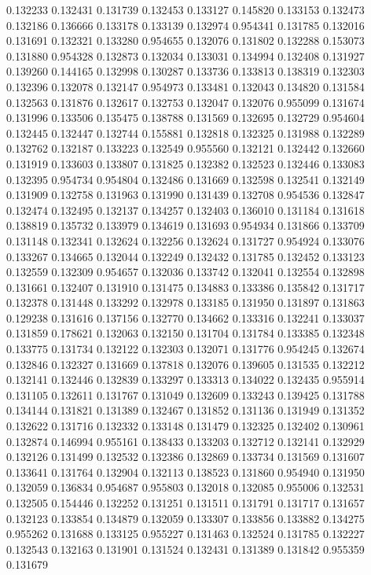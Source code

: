 0.132233
0.132431
0.131739
0.132453
0.133127
0.145820
0.133153
0.132473
0.132186
0.136666
0.133178
0.133139
0.132974
0.954341
0.131785
0.132016
0.131691
0.132321
0.133280
0.954655
0.132076
0.131802
0.132288
0.153073
0.131880
0.954328
0.132873
0.132034
0.133031
0.134994
0.132408
0.131927
0.139260
0.144165
0.132998
0.130287
0.133736
0.133813
0.138319
0.132303
0.132396
0.132078
0.132147
0.954973
0.133481
0.132043
0.134820
0.131584
0.132563
0.131876
0.132617
0.132753
0.132047
0.132076
0.955099
0.131674
0.131996
0.133506
0.135475
0.138788
0.131569
0.132695
0.132729
0.954604
0.132445
0.132447
0.132744
0.155881
0.132818
0.132325
0.131988
0.132289
0.132762
0.132187
0.133223
0.132549
0.955560
0.132121
0.132442
0.132660
0.131919
0.133603
0.133807
0.131825
0.132382
0.132523
0.132446
0.133083
0.132395
0.954734
0.954804
0.132486
0.131669
0.132598
0.132541
0.132149
0.131909
0.132758
0.131963
0.131990
0.131439
0.132708
0.954536
0.132847
0.132474
0.132495
0.132137
0.134257
0.132403
0.136010
0.131184
0.131618
0.138819
0.135732
0.133979
0.134619
0.131693
0.954934
0.131866
0.133709
0.131148
0.132341
0.132624
0.132256
0.132624
0.131727
0.954924
0.133076
0.133267
0.134665
0.132044
0.132249
0.132432
0.131785
0.132452
0.133123
0.132559
0.132309
0.954657
0.132036
0.133742
0.132041
0.132554
0.132898
0.131661
0.132407
0.131910
0.131475
0.134883
0.133386
0.135842
0.131717
0.132378
0.131448
0.133292
0.132978
0.133185
0.131950
0.131897
0.131863
0.129238
0.131616
0.137156
0.132770
0.134662
0.133316
0.132241
0.133037
0.131859
0.178621
0.132063
0.132150
0.131704
0.131784
0.133385
0.132348
0.133775
0.131734
0.132122
0.132303
0.132071
0.131776
0.954245
0.132674
0.132846
0.132327
0.131669
0.137818
0.132076
0.139605
0.131535
0.132212
0.132141
0.132446
0.132839
0.133297
0.133313
0.134022
0.132435
0.955914
0.131105
0.132611
0.131767
0.131049
0.132609
0.133243
0.139425
0.131788
0.134144
0.131821
0.131389
0.132467
0.131852
0.131136
0.131949
0.131352
0.132622
0.131716
0.132332
0.133148
0.131479
0.132325
0.132402
0.130961
0.132874
0.146994
0.955161
0.138433
0.133203
0.132712
0.132141
0.132929
0.132126
0.131499
0.132532
0.132386
0.132869
0.133734
0.131569
0.131607
0.133641
0.131764
0.132904
0.132113
0.138523
0.131860
0.954940
0.131950
0.132059
0.136834
0.954687
0.955803
0.132018
0.132085
0.955006
0.132531
0.132505
0.154446
0.132252
0.131251
0.131511
0.131791
0.131717
0.131657
0.132123
0.133854
0.134879
0.132059
0.133307
0.133856
0.133882
0.134275
0.955262
0.131688
0.133125
0.955227
0.131463
0.132524
0.131785
0.132227
0.132543
0.132163
0.131901
0.131524
0.132431
0.131389
0.131842
0.955359
0.131679
